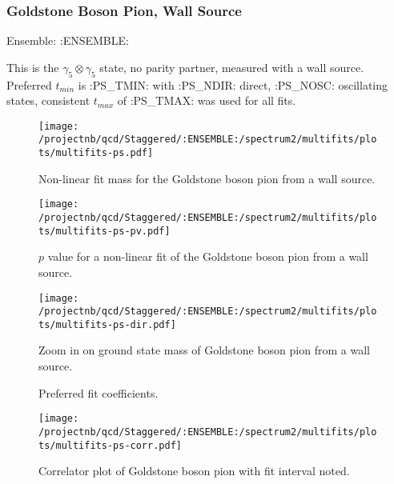 \subsubsection{Goldstone Boson Pion, Wall Source}

Ensemble: :ENSEMBLE:

This is the $\gamma_5 \otimes \gamma_5$ state, no parity partner, measured with a wall source. Preferred $t_{min}$ is :PS_TMIN: with :PS_NDIR: direct, :PS_NOSC: oscillating states, consistent $t_{max}$ of :PS_TMAX: was used for all fits.

\begin{comment}
\begin{table}[ht!]
\centering
\scriptsize
\begin{tabular}{|c|c|c|c|}
\hline
 $t_{min}$ & $c_{\pi, GB}$ &  $M_{\pi, GB}$ & $p$-value \\
\hline

\end{tabular}
\caption{Fit values for the goldstone boson pion amplitude and mass, defined by the fit form in Section~\ref{sec:coshcorr}.}
\end{table}
\end{comment}

\begin{multicols}{2}
\begin{figure}[H]
\centering
\texttt{[image: /projectnb/qcd/Staggered/:ENSEMBLE:/spectrum2/multifits/plots/multifits-ps.pdf]}
\caption{Non-linear fit mass for the Goldstone boson pion from a wall source.}
\end{figure}
\columnbreak
\begin{figure}[H]
\centering
\texttt{[image: /projectnb/qcd/Staggered/:ENSEMBLE:/spectrum2/multifits/plots/multifits-ps-pv.pdf]}
\caption{$p$ value for a non-linear fit of the Goldstone boson pion from a wall source.}
\end{figure}
\end{multicols}

\begin{figure}[H]
\centering
\texttt{[image: /projectnb/qcd/Staggered/:ENSEMBLE:/spectrum2/multifits/plots/multifits-ps-dir.pdf]}
\caption{Zoom in on ground state mass of Goldstone boson pion from a wall source.}
\end{figure}

\begin{multicols}{2}
\begin{figure}[H]
\centering
\scriptsize

\caption{Preferred fit coefficients.}
\end{figure}
\columnbreak
\begin{figure}[H]
\centering
\texttt{[image: /projectnb/qcd/Staggered/:ENSEMBLE:/spectrum2/multifits/plots/multifits-ps-corr.pdf]}
\caption{Correlator plot of Goldstone boson pion with fit interval noted.}
\end{figure}
\end{multicols}

